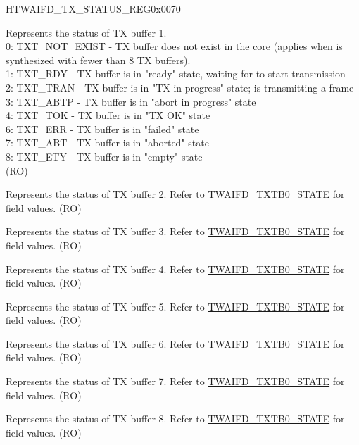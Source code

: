\begin{register}{H}{TWAIFD\_TX\_STATUS\_REG}{0x0070}\label{regdesc:TWAIFDTXSTATUSREG}
%
%
%
%
%
%
%
%
\regnewline%
\begin{regdesc}\begin{reglist}
\label{fielddesc:TWAIFDTXTB0STATE}\item [TWAIFD\_TXTB0\_STATE] Represents the status of TX buffer 1.\\
0: TXT\_NOT\_EXIST - TX buffer does not exist in the core (applies when \modulename is synthesized with fewer than 8 TX buffers).\\
1: TXT\_RDY - TX buffer is in "ready" state, waiting for \modulename to start transmission\\
2: TXT\_TRAN - TX buffer is in "TX in progress" state; \modulename is transmitting a frame\\
3: TXT\_ABTP - TX buffer is in "abort in progress" state\\
4: TXT\_TOK - TX buffer is in "TX OK" state\\
6: TXT\_ERR - TX buffer is in "failed" state\\
7: TXT\_ABT - TX buffer is in "aborted" state\\
8: TXT\_ETY - TX buffer is in "empty" state\\(RO)
\label{fielddesc:TWAIFDTX2S}\item [TWAIFD\_TX2S] Represents the status of TX buffer 2. Refer to \hyperref[fielddesc:TWAIFDTXTB0STATE]{TWAIFD\_TXTB0\_STATE} for field values. (RO)
\label{fielddesc:TWAIFDTX3S}\item [TWAIFD\_TX3S] Represents the status of TX buffer 3. Refer to \hyperref[fielddesc:TWAIFDTXTB0STATE]{TWAIFD\_TXTB0\_STATE} for field values. (RO)
\label{fielddesc:TWAIFDTX4S}\item [TWAIFD\_TX4S] Represents the status of TX buffer 4. Refer to \hyperref[fielddesc:TWAIFDTXTB0STATE]{TWAIFD\_TXTB0\_STATE} for field values. (RO)
\label{fielddesc:TWAIFDTX5S}\item [TWAIFD\_TX5S] Represents the status of TX buffer 5. Refer to \hyperref[fielddesc:TWAIFDTXTB0STATE]{TWAIFD\_TXTB0\_STATE} for field values. (RO)
\label{fielddesc:TWAIFDTX6S}\item [TWAIFD\_TX6S] Represents the status of TX buffer 6. Refer to \hyperref[fielddesc:TWAIFDTXTB0STATE]{TWAIFD\_TXTB0\_STATE} for field values. (RO)
\label{fielddesc:TWAIFDTX7S}\item [TWAIFD\_TX7S] Represents the status of TX buffer 7. Refer to \hyperref[fielddesc:TWAIFDTXTB0STATE]{TWAIFD\_TXTB0\_STATE} for field values. (RO)
\label{fielddesc:TWAIFDTX8S}\item [TWAIFD\_TX8S] Represents the status of TX buffer 8. Refer to \hyperref[fielddesc:TWAIFDTXTB0STATE]{TWAIFD\_TXTB0\_STATE} for field values. (RO)
\end{reglist}\end{regdesc}
\end{register}


